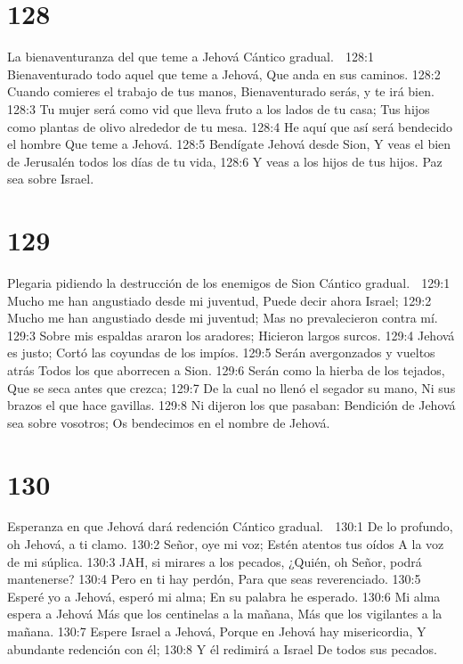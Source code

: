 \chapter{128}

La bienaventuranza del que teme a Jehová 
Cántico gradual. 

128:1 Bienaventurado todo aquel que teme a Jehová, 
Que anda en sus caminos. 
128:2 Cuando comieres el trabajo de tus manos, 
Bienaventurado serás, y te irá bien. 
128:3 Tu mujer será como vid que lleva fruto a los lados de tu casa; 
Tus hijos como plantas de olivo alrededor de tu mesa. 
128:4 He aquí que así será bendecido el hombre 
Que teme a Jehová. 
128:5 Bendígate Jehová desde Sion, 
Y veas el bien de Jerusalén todos los días de tu vida, 
128:6 Y veas a los hijos de tus hijos. 
Paz sea sobre Israel. 

\chapter{129}

Plegaria pidiendo la destrucción de los enemigos de Sion 
Cántico gradual. 

129:1 Mucho me han angustiado desde mi juventud, 
Puede decir ahora Israel; 
129:2 Mucho me han angustiado desde mi juventud; 
Mas no prevalecieron contra mí. 
129:3 Sobre mis espaldas araron los aradores; 
Hicieron largos surcos. 
129:4 Jehová es justo; 
Cortó las coyundas de los impíos. 
129:5 Serán avergonzados y vueltos atrás 
Todos los que aborrecen a Sion. 
129:6 Serán como la hierba de los tejados, 
Que se seca antes que crezca; 
129:7 De la cual no llenó el segador su mano, 
Ni sus brazos el que hace gavillas. 
129:8 Ni dijeron los que pasaban: 
Bendición de Jehová sea sobre vosotros; 
Os bendecimos en el nombre de Jehová. 

\chapter{130}

Esperanza en que Jehová dará redención 
Cántico gradual. 

130:1 De lo profundo, oh Jehová, a ti clamo. 
130:2 Señor, oye mi voz; 
Estén atentos tus oídos 
A la voz de mi súplica. 
130:3 JAH, si mirares a los pecados, 
¿Quién, oh Señor, podrá mantenerse? 
130:4 Pero en ti hay perdón, 
Para que seas reverenciado. 
130:5 Esperé yo a Jehová, esperó mi alma; 
En su palabra he esperado. 
130:6 Mi alma espera a Jehová 
Más que los centinelas a la mañana, 
Más que los vigilantes a la mañana. 
130:7 Espere Israel a Jehová, 
Porque en Jehová hay misericordia, 
Y abundante redención con él; 
130:8 Y él redimirá a Israel 
De todos sus pecados. 


